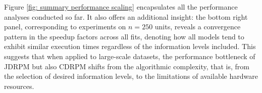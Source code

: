 \documentclass[12pt,	%
	a4paper,		%
	twoside,		%
	openright,		%
	titlepage,%
	]{book}
\theoremstyle{definition}
\begin{document}
Figure \ref{fig: summary performance scaling} encapsulates all the performance analyses conducted so far. It also offers an additional insight: the bottom right panel, corresponding to experiments on $n=250$ units, reveals a convergence pattern in the speedup factors across all fits, denoting how all models tend to exhibit similar execution times regardless of the information levels included. This suggests that when applied to large-scale datasets, the performance bottleneck of JDRPM but also CDRPM shifts from the algorithmic complexity, that is, from the selection of desired information levels, to the limitations of available hardware resources. 

\end{document}
